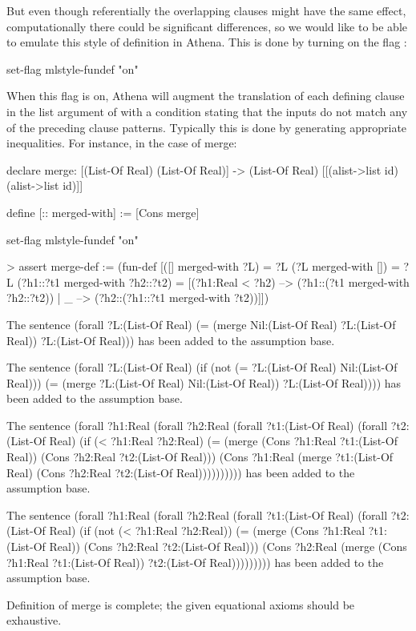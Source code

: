 But even though referentially the overlapping clauses might 
have the same effect, computationally there could be significant
differences, so we would like to be able to emulate this style 
of definition in Athena. This is done by turning on the flag
:
\begin{tcAthena}
set-flag mlstyle-fundef "on"
\end{tcAthena}
When this flag is on, Athena will augment the translation of
each defining clause in the list argument of  
with a condition stating that the inputs do not match any of the 
preceding clause patterns. Typically this is done by generating
appropriate inequalities. For instance, in the case of merge:
\begin{tcAthena}
declare merge: [(List-Of Real) (List-Of Real)] -> (List-Of Real) 
                   [[(alist->list id) (alist->list id)]]

define [:: merged-with] := [Cons merge]

set-flag mlstyle-fundef "on"

> assert merge-def :=
    (fun-def [([] merged-with ?L) = ?L
              (?L merged-with []) = ?L
              (?h1::?t1 merged-with ?h2::?t2) = 
                  [(?h1:Real < ?h2) --> (?h1::(?t1 merged-with ?h2::?t2))
                 | _ --> (?h2::(?h1::?t1 merged-with ?t2))]])


The sentence 
(forall ?L:(List-Of Real)
  (= (merge Nil:(List-Of Real)
            ?L:(List-Of Real))
     ?L:(List-Of Real)))
has been added to the assumption base.

The sentence 
(forall ?L:(List-Of Real)
  (if (not (= ?L:(List-Of Real)
              Nil:(List-Of Real)))
      (= (merge ?L:(List-Of Real)
                Nil:(List-Of Real))
         ?L:(List-Of Real))))
has been added to the assumption base.

The sentence 
(forall ?h1:Real
  (forall ?h2:Real
    (forall ?t1:(List-Of Real)
      (forall ?t2:(List-Of Real)
        (if (< ?h1:Real ?h2:Real)
            (= (merge (Cons ?h1:Real
                            ?t1:(List-Of Real))
                      (Cons ?h2:Real
                            ?t2:(List-Of Real)))
               (Cons ?h1:Real
                     (merge ?t1:(List-Of Real)
                            (Cons ?h2:Real
                                  ?t2:(List-Of Real))))))))))
has been added to the assumption base.

The sentence 
(forall ?h1:Real
  (forall ?h2:Real
    (forall ?t1:(List-Of Real)
      (forall ?t2:(List-Of Real)
        (if (not (< ?h1:Real ?h2:Real))
            (= (merge (Cons ?h1:Real
                            ?t1:(List-Of Real))
                      (Cons ?h2:Real
                            ?t2:(List-Of Real)))
               (Cons ?h2:Real
                     (merge (Cons ?h1:Real
                                  ?t1:(List-Of Real))
                            ?t2:(List-Of Real)))))))))
has been added to the assumption base.

Definition of merge is complete; the given equational axioms should be exhaustive.
\end{tcAthena}
